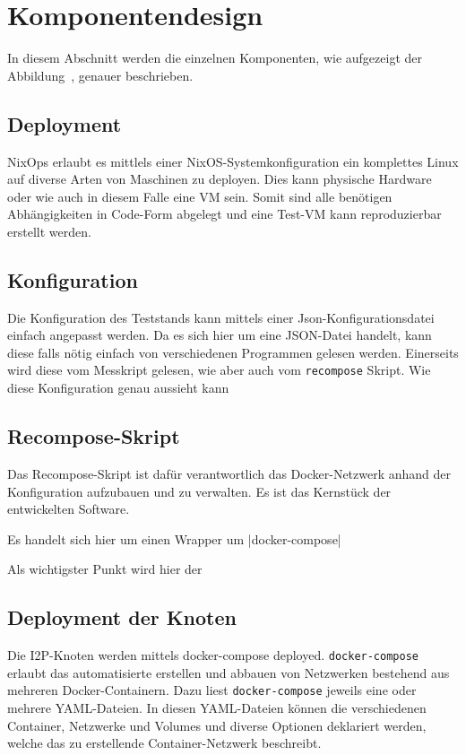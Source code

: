 \section{Komponentendesign}\label{sec:komponentendesign}

In diesem Abschnitt werden die einzelnen Komponenten, wie aufgezeigt der Abbildung~, genauer beschrieben.

\subsection{Deployment}

NixOps erlaubt es mittlels einer NixOS-Systemkonfiguration ein komplettes Linux auf diverse Arten von Maschinen zu deployen. Dies kann physische Hardware oder wie auch in diesem Falle eine VM sein.
Somit sind alle benötigen Abhängigkeiten in Code-Form abgelegt und eine Test-VM kann reproduzierbar erstellt werden.

\subsection{Konfiguration}

Die Konfiguration des Teststands kann mittels einer Json-Konfigurationsdatei einfach angepasst werden.
Da es sich hier um eine JSON-Datei handelt, kann diese falls nötig einfach von verschiedenen Programmen gelesen werden.
Einerseits wird diese vom Messkript gelesen, wie aber auch vom \lstinline|recompose| Skript.
Wie diese Konfiguration genau aussieht kann


\subsection{Recompose-Skript}

Das Recompose-Skript ist dafür verantwortlich das Docker-Netzwerk anhand der Konfiguration aufzubauen und zu verwalten.
Es ist das Kernstück der entwickelten Software.

Es handelt sich hier um einen Wrapper um \lstinlline|docker-compose|

Als wichtigster Punkt wird hier der 

\subsection{Deployment der Knoten}

Die I2P-Knoten werden mittels docker-compose deployed.
\lstinline|docker-compose| erlaubt das automatisierte erstellen und abbauen von Netzwerken bestehend aus mehreren Docker-Containern.
Dazu liest \lstinline|docker-compose| jeweils eine oder mehrere YAML-Dateien.
In diesen YAML-Dateien können die verschiedenen Container, Netzwerke und Volumes und diverse Optionen deklariert werden, welche das zu erstellende Container-Netzwerk beschreibt.

